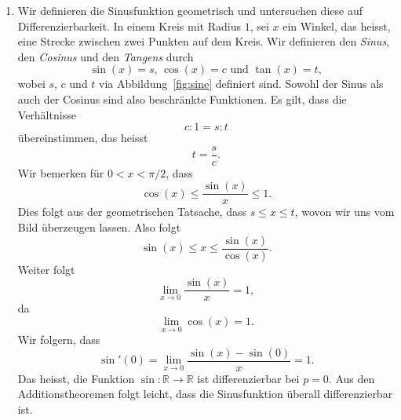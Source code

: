 \documentclass[../main.tex]{subfiles}
\begin{document}
\begin{examples}
\begin{enumerate}[(1)]
    \item Wir definieren die Sinusfunktion geometrisch
      und untersuchen diese auf Differenzierbarkeit.
      In einem Kreis mit Radius $1$, sei $x$ ein Winkel,
      das heisst, eine Strecke zwischen zwei Punkten auf
      dem Kreis.
      Wir definieren den \emph{Sinus},
      den \emph{Cosinus} und den \emph{Tangens} durch
      \[
        \sin(x) = s \text{, } \cos(x) = c \text{ und }
        \tan(x) = t,
      \]
      wobei $s$, $c$ und $t$ via Abbildung~\ref{fig:sine}
      definiert sind.
      Sowohl der Sinus als auch der Cosinus
      sind also beschränkte Funktionen.
      Es gilt, dass die Verhältnisse
      \[
        c : 1 = s : t
      \]
      übereinstimmen, das heisst
      \[
        t = \frac{s}{c}.
      \]
      Wir bemerken für
      $0 < x < \pi/2$, dass
      \[
        \cos(x) \leq \frac{\sin(x)}{x} \leq 1.
      \]
      Dies folgt aus der geometrischen Tatsache,
      dass $s \leq x \leq t$,
      wovon wir uns vom Bild überzeugen lassen. %
      Also folgt
      \[
        \sin(x) \leq x \leq \frac{\sin(x)}{\cos(x)}.
      \]
      Weiter folgt
      \[
        \lim_{x \to 0} \frac{\sin(x)}{x} = 1,
      \]
      da
      \[
        \lim_{x \to 0} \cos(x) = 1.
      \]
      Wir folgern, dass
      \[
        \sin'(0) =
        \lim_{x \to 0} \frac{\sin(x) - \sin(0)}{x}
        = 1.
      \]
      Das heisst, die Funktion
      $\sin \colon \mathbb{R} \to \mathbb{R}$ ist differenzierbar
      bei $p = 0$.
      Aus den Additionstheoremen folgt leicht,
      dass die Sinusfunktion überall differenzierbar ist.


\end{enumerate}
\end{examples}
\end{document}
